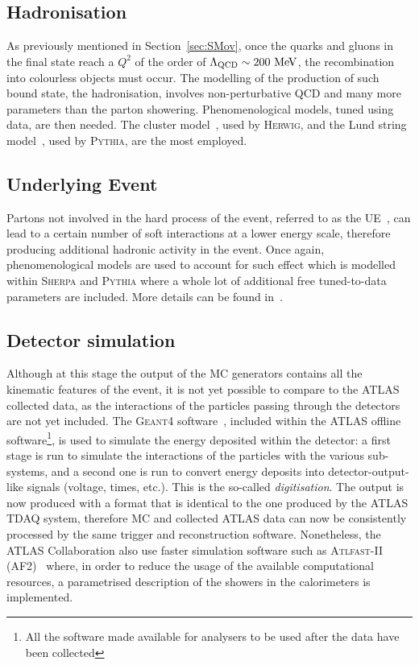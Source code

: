 		\subsection*{Hadronisation}

			As previously mentioned in Section~\ref{sec:SMov}, once the quarks and gluons in the final state reach a $Q^2$ of the order of $\Lambda_{\mathrm{QCD}} \sim 200 \MeV$, the recombination into colourless objects must occur. The modelling of the production of such bound state, the hadronisation, involves non-perturbative \ac{QCD} and many more parameters than the parton showering. Phenomenological models, tuned using data, are then needed. The cluster model~\cite{ClusterHerwig1999}, used by \textsc{Herwig}, and the Lund string model~\cite{LundModel2002}, used by \textsc{Pythia}, are the most employed. 

		\subsection*{Underlying Event}

			Partons not involved in the hard process of the event, referred to as the \ac{UE}~\cite{Field2008}, can lead to a certain number of soft interactions at a lower energy scale, therefore producing additional hadronic activity in the event. Once again, phenomenological models are used to account for such effect which is modelled within \textsc{Sherpa} and \textsc{Pythia} where a whole lot of additional free tuned-to-data parameters are included. More details can be found in~\cite{Field2008}.

		\subsection*{Detector simulation}
		\label{subsec:detSim}

			Although at this stage the output of the \ac{MC} generators contains all the kinematic features of the event, it is not yet possible to compare to the \ac{ATLAS} collected data, as the interactions of the particles passing through the detectors are not yet included. The \textsc{Geant4} software~\cite{Geant42003}, included within the \ac{ATLAS} offline software\footnote{All the software made available for analysers to be used after the data have been collected}, is used to simulate the energy deposited within the detector: a first stage is run to simulate the interactions of the particles with the various sub-systems, and a second one is run to convert energy deposits into detector-output-like signals (voltage, times, etc.). This is the so-called \emph{digitisation}. The output is now produced with a format that is identical to the one produced by the \ac{ATLAS} \ac{TDAQ} system, therefore \ac{MC} and collected \ac{ATLAS} data can now be consistently processed by the same trigger and reconstruction software. Nonetheless, the \ac{ATLAS} Collaboration also use faster simulation software such as \textsc{Atlfast-II} (AF2)~\cite{Lukas2012} where, in order to reduce the usage of the available computational resources, a parametrised description of the showers in the calorimeters is implemented. 


